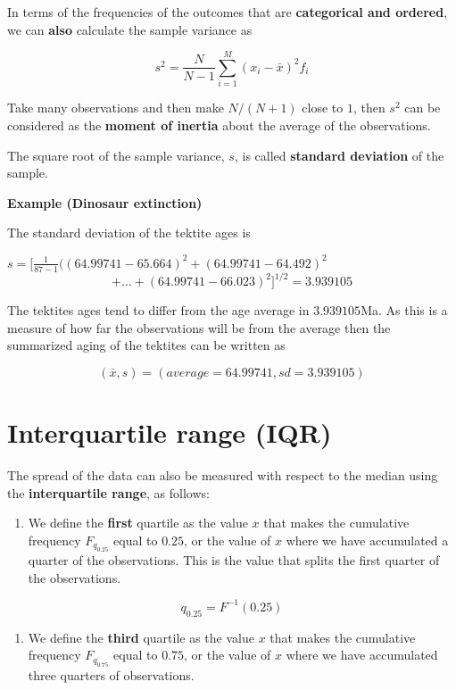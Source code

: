 \documentclass[
]{book}
\providecommand{\tightlist}{%
  \setlength{\itemsep}{0pt}\setlength{\parskip}{0pt}}
\begin{document}
In terms of the frequencies of the outcomes that are \textbf{categorical and ordered}, we can \textbf{also} calculate the sample variance as

\[s^2=\frac{N}{N-1} \sum_{i=1}^M (x_i -\bar{x})^2 f_i\]

Take many observations and then make \(N/(N+1)\) close to \(1\), then \(s^2\) can be considered as the \textbf{moment of inertia} about the average of the observations.

The square root of the sample variance, \(s\), is called \textbf{standard deviation} of the sample.

\textbf{Example (Dinosaur extinction)}

The standard deviation of the tektite ages is

\(s= [\frac{ 1}{87-1}((64.99741-65.664)^2+ (64.99741-64.492)^2\)
\[+ ... + (64.99741-66.023)^ 2]^{1/2} = 3.939105\]

The tektites ages tend to differ from the age average in \(3.939105\)Ma. As this is a measure of how far the observations will be from the average then the summarized aging of the tektites can be written as

\[(\bar{x}, s)= (average=64.99741, sd= 3.939105)\]

\hypertarget{interquartile-range-iqr}{%
\section{Interquartile range (IQR)}\label{interquartile-range-iqr}}

The spread of the data can also be measured with respect to the median using the \textbf{interquartile range}, as follows:

\begin{enumerate}
\def\labelenumi{\arabic{enumi})}
\tightlist
\item
  We define the \textbf{first} quartile as the value \(x\) that makes the cumulative frequency \(F_{q_{0.25}}\) equal to \(0.25\), or the value of \(x\) where we have accumulated a quarter of the observations. This is the value that splits the first quarter of the observations.
\end{enumerate}

\[q_{0.25}=F^{-1}(0.25)\]

\begin{enumerate}
\def\labelenumi{\arabic{enumi})}
\setcounter{enumi}{1}
\tightlist
\item
  We define the \textbf{third} quartile as the value \(x\) that makes the cumulative frequency \(F_{q_{0.75}}\) equal to \(0.75\), or the value of \(x\) where we have accumulated three quarters of observations.
\end{enumerate}
\end{document}
